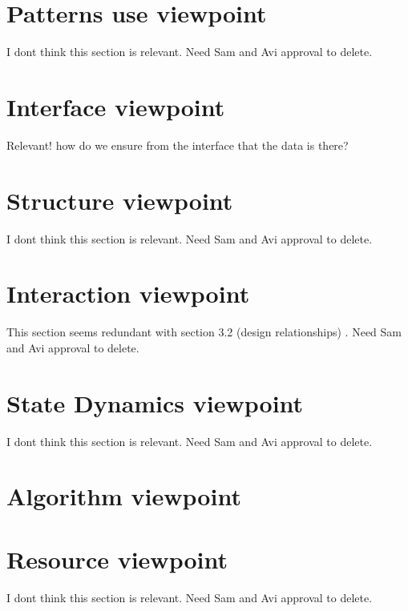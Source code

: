 \documentclass[onecolumn, draftclsnofoot,10pt, compsoc]{IEEEtran}
\begin{document}
\section{Patterns use viewpoint}
I dont think this section is relevant. Need Sam and Avi approval to delete.
\section{Interface viewpoint}
Relevant! how do we ensure from the interface that the data is there?

\section{Structure viewpoint}
I dont think this section is relevant. Need Sam and Avi approval to delete.
\section{Interaction viewpoint}
This section seems redundant with section 3.2 (design relationships) . Need Sam and Avi approval to delete.
\section{State Dynamics viewpoint}
I dont think this section is relevant. Need Sam and Avi approval to delete.
\section{Algorithm viewpoint}

\section{Resource viewpoint}

I dont think this section is relevant. Need Sam and Avi approval to delete.
\end{document}
